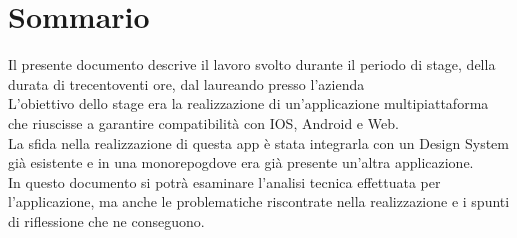 \cleardoublepage
{}
{}
\begingroup
\let\clearpage\relax
\let\cleardoublepage\relax
\chapter*{Sommario}

Il presente documento descrive il lavoro svolto durante il periodo di stage, della durata di trecentoventi ore, dal laureando \myName presso l'azienda \myAzienda
\\L'obiettivo dello stage era la realizzazione di un'applicazione multipiattaforma che riuscisse a garantire compatibilità con IOS, Android e Web.
\\La sfida nella realizzazione di questa app è stata integrarla con un Design System già esistente e in una \gls{monorepog}\glox dove era già presente un'altra applicazione.
\\In questo documento si potrà esaminare l'analisi tecnica effettuata per l'applicazione, ma anche le problematiche riscontrate nella realizzazione e i spunti di riflessione che ne conseguono.

\endgroup
\vfill
